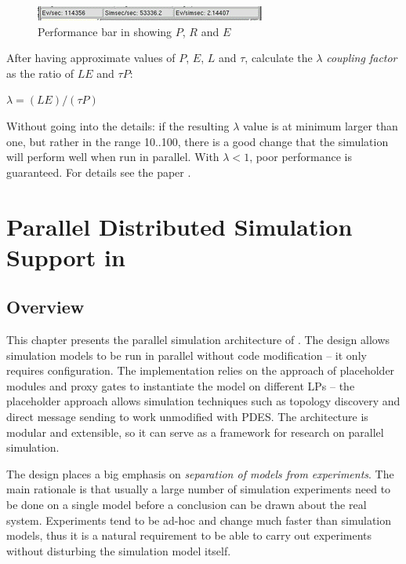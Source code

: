 \begin{figure}[htbp]
  \begin{center}
    \includegraphics{figures/parsim-perfbar-screenshot}
    \caption{Performance bar in {\opp} showing $P$, $R$ and $E$}
    \label{fig:perfbar-screenshot}
  \end{center}
\end{figure}

After having approximate values of $P$, $E$, $L$ and $\tau$,
calculate the $\lambda$ \textit{coupling factor} as the ratio of $LE$ and $\tau P$:

$\lambda = (LE) / (\tau P)$

Without going into the details: if the resulting $\lambda$ value is at
minimum larger than one, but rather in the range 10..100, there is
a good change that the simulation will perform well when run in
parallel. With $\lambda < 1$, poor performance is guaranteed.
For details see the paper \cite{ParsimCrit03}.


\section{Parallel Distributed Simulation Support in {\opp}}

\subsection{Overview}

This chapter presents the parallel simulation architecture
of {\opp}. The design allows simulation models to be run
in parallel without code modification -- it only requires configuration.
The implementation relies on the approach of placeholder modules
and proxy gates to instantiate the model on different LPs --
the placeholder approach allows simulation techniques such as
topology discovery and direct message sending to work unmodified with
PDES. The architecture is modular and extensible, so it can
serve as a framework for research on parallel simulation.

The {\opp} design places a big emphasis on
\textit{separation of models from experiments}. The main rationale
is that usually a large number of simulation experiments need to be done
on a single model before a conclusion can be drawn about the real system.
Experiments tend to be ad-hoc and change much faster than simulation
models, thus it is a natural requirement to be able to
carry out experiments without disturbing the simulation model itself.

